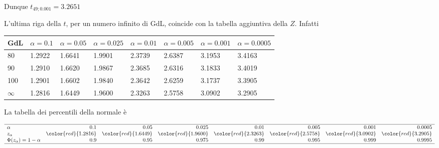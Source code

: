 \documentclass[
  11pt,
]{book}
\theoremstyle{mytheoremstyle}
\theoremstyle{mydefstyle}
\newenvironment{nota}
  {
\begin{tcolorbox}[enhanced,breakable,arc=0.1mm,boxrule=1pt,colback=white,colframe=iblue,title=\bf \fontfamily{lmss}\selectfont \faInfoCircle \hspace{.5 cm} Nota,drop fuzzy shadow]
}{
\end{tcolorbox}
  }
\begin{document}
Dunque \(t_{49;0.001}=3.2651\)

\begin{nota}
L'ultima riga della \(t\), per un numero infinito di GdL, coincide con la tabella aggiuntiva della \(Z\). Infatti
\scriptsize\vspace{10 pt}

\begin{center}

\begin{table}[H]
\centering\centering
\fontsize{12}{14}\selectfont
\begin{tabular}{llllllll}
\toprule
GdL & $\alpha=0.1$ & $\alpha=0.05$ & $\alpha=0.025$ & $\alpha=0.01$ & $\alpha=0.005$ & $\alpha=0.001$ & $\alpha=0.0005$\\
\midrule
80 & 1.2922 & 1.6641 & 1.9901 & 2.3739 & 2.6387 & 3.1953 & 3.4163\\
90 & 1.2910 & 1.6620 & 1.9867 & 2.3685 & 2.6316 & 3.1833 & 3.4019\\
100 & 1.2901 & 1.6602 & 1.9840 & 2.3642 & 2.6259 & 3.1737 & 3.3905\\
\textcolor[HTML]{AB292E}{$\infty$} & \textcolor[HTML]{AB292E}{1.2816} & \textcolor[HTML]{AB292E}{1.6449} & \textcolor[HTML]{AB292E}{1.9600} & \textcolor[HTML]{AB292E}{2.3263} & \textcolor[HTML]{AB292E}{2.5758} & \textcolor[HTML]{AB292E}{3.0902} & \textcolor[HTML]{AB292E}{3.2905}\\
\bottomrule
\end{tabular}
\end{table}

\end{center}

\vspace{10 pt}
\normalsize

La tabella dei percentili della normale è
\scriptsize

\[\begin{array}{lrrrrrrr}
\hline
\alpha & 0.1 & 0.05 & 0.025 & 0.01 & 0.005 & 0.001 & 0.0005 \\ 
z_\alpha & \color{red}{ 1.2816} &\color{red}{1.6449} &\color{red}{1.9600} &\color{red}{2.3263} &\color{red}{2.5758} &\color{red}{3.0902} &\color{red}{3.2905 } \\ 
\Phi(z_\alpha)=1-\alpha & 0.9 & 0.95 & 0.975 & 0.99 & 0.995 & 0.999 & 0.9995 \\
\hline
\end{array}\]

\end{nota}

\normalsize
\end{document}
